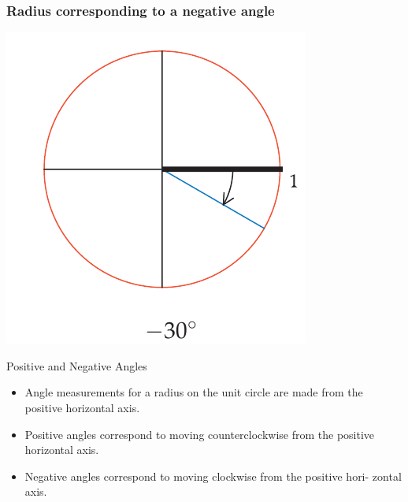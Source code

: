 \documentclass{beamer}
\begin{document}
    \begin{frame}
        \frametitle{Radius corresponding to a negative angle}
        \centering
        \includegraphics[scale=0.5]{2.png}
    
    \end{frame}
    
    \begin{frame}
        \begin{block}{Positive and Negative Angles}
            \begin{itemize}
                \item Angle measurements for a radius on the unit circle are made from the
                positive horizontal axis.
                \item Positive angles correspond to moving counterclockwise from the positive
                horizontal axis.
                \item Negative angles correspond to moving clockwise from the positive hori-
                zontal axis.
            \end{itemize}
        \end{block}
    \end{frame}
    
\end{document}
